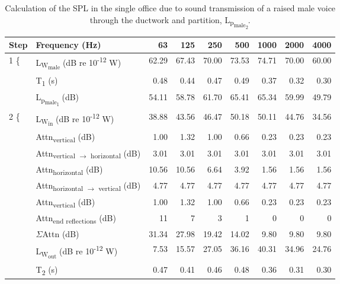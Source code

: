 \begin{table}[htbp]
	\caption{Calculation of the SPL in the single office due to sound transmission of a raised male voice through the ductwork and partition, L\textsubscript{p\textsubscript{male\textsubscript{2}}}.}
	\label{tbl:SPL_office}
	\centering
	\begin{tabular}{@{}l@{\hspace*{0.5em}}lrrrrrrr@{}}%
		\toprule
		Step & Frequency (Hz) & 63 & 125 & 250 & 500 & 1000 & 2000 & 4000 \\ \midrule
		\multirow{3}{*}{1 \vast\{ } & L\textsubscript{W\textsubscript{male}} (dB re 10\textsuperscript{-12} W) & 62.29 & 67.43 & 70.00 & 73.53 & 74.71 & 70.00 & 60.00 \\
		& T\textsubscript{1} (s) & 0.48 & 0.44 & 0.47 & 0.49 & 0.37 & 0.32 & 0.30 \\
		& L\textsubscript{p\textsubscript{male\textsubscript{1}}} (dB) & 54.11 & 58.78 & 61.70 & 65.41 & 65.34 & 59.99 & 49.79 \\
		\multirow{11}{*}{2 \Vast\{ } & L\textsubscript{W\textsubscript{in}} (dB re 10\textsuperscript{-12} W) & 38.88 & 43.56 & 46.47 & 50.18 & 50.11 & 44.76 & 34.56 \\
		& Attn\textsubscript{vertical} (dB) & 1.00 & 1.32 & 1.00 & 0.66 & 0.23 & 0.23 & 0.23 \\
		& Attn\textsubscript{vertical $\rightarrow$ horizontal} (dB) & 3.01 & 3.01 & 3.01 & 3.01 & 3.01 & 3.01 & 3.01 \\
		& Attn\textsubscript{horizontal} (dB) & 10.56 & 10.56 & 6.64 & 3.92 & 1.56 & 1.56 & 1.56 \\
		& Attn\textsubscript{horizontal $\rightarrow$ vertical} (dB) & 4.77 & 4.77 & 4.77 & 4.77 & 4.77 & 4.77 & 4.77 \\
		& Attn\textsubscript{vertical} (dB) & 1.00 & 1.32 & 1.00 & 0.66 & 0.23 & 0.23 & 0.23 \\
		& Attn\textsubscript{end reflections} (dB) & 11 & 7 & 3 & 1 & 0 & 0 & 0 \\
		& $\Sigma$Attn (dB) & 31.34 & 27.98 & 19.42 & 14.02 & 9.80 & 9.80 & 9.80 \\
		& L\textsubscript{W\textsubscript{out}} (dB re 10\textsuperscript{-12} W) & 7.53 & 15.57 & 27.05 & 36.16 & 40.31 & 34.96 & 24.76 \\
		& T\textsubscript{2} (s) & 0.47 & 0.41 & 0.46 & 0.48 & 0.36 & 0.31 & 0.30 \\

\end{tabular}
\end{table}
